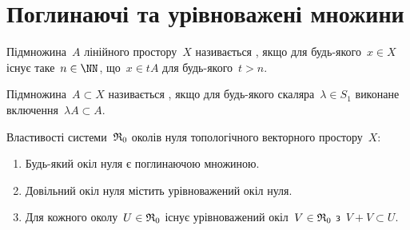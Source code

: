 \section{Поглинаючі та урівноважені множини}

\begin{definition}
    Підмножина~$A$ лінійного простору~$X$ називається , якщо для будь-якого~$x \in X$ існує таке~$n \in \NN$, що~$x \in t A$ для будь-якого~$t > n$.
\end{definition}

\begin{definition}
    Підмножина~$A \subset X$ називається , якщо для будь-якого скаляра~$\lambda \in S_1$ виконане включення~$\lambda A \subset A$.
\end{definition}

\begin{theorem}
    \label{th:tvs-zero-neighbourhood-properties}
    Властивості системи~$\frak R_0$ околів нуля топологічного векторного простору~$X$:
    \begin{enumerate}
        \item Будь-який окіл нуля є поглинаючою множиною.
        \item Довільний окіл нуля містить урівноважений окіл нуля.
        \item Для кожного околу~$U \in \frak R_0$ існує урівноважений окіл~$V \in \frak R_0$ з~$V + V \subset U$.
    \end{enumerate}
\end{theorem}

